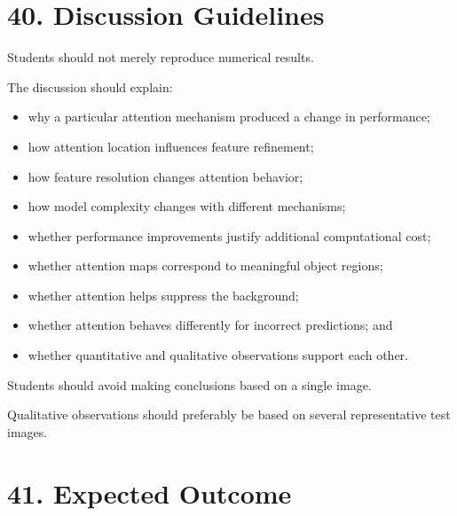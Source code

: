 \documentclass[10pt]{article}
\begin{document}
\section*{40. Discussion Guidelines}

Students should not merely reproduce numerical results.

The discussion should explain:

\begin{itemize}

\item why a particular attention mechanism produced a change in performance;

\item how attention location influences feature refinement;

\item how feature resolution changes attention behavior;

\item how model complexity changes with different mechanisms;

\item whether performance improvements justify additional computational cost;

\item whether attention maps correspond to meaningful object regions;

\item whether attention helps suppress the background;

\item whether attention behaves differently for incorrect predictions; and

\item whether quantitative and qualitative observations support each other.

\end{itemize}

Students should avoid making conclusions based on a single image.

Qualitative observations should preferably be based on several representative
test images.

\section*{41. Expected Outcome}
\end{document}
